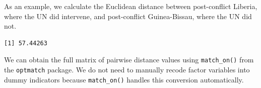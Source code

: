 \documentclass[
  12pt,
  leqno]{article}
\newenvironment{Shaded}{\begin{snugshade}}{\end{snugshade}}
\newcommand{\CommentTok}[1]{\textcolor[rgb]{0.56,0.35,0.01}{\textit{#1}}}
\newcommand{\DecValTok}[1]{\textcolor[rgb]{0.00,0.00,0.81}{#1}}
\newcommand{\FunctionTok}[1]{\textcolor[rgb]{0.13,0.29,0.53}{\textbf{#1}}}
\newcommand{\NormalTok}[1]{#1}
\newcommand{\OtherTok}[1]{\textcolor[rgb]{0.56,0.35,0.01}{#1}}
\newcommand{\SpecialCharTok}[1]{\textcolor[rgb]{0.81,0.36,0.00}{\textbf{#1}}}
\newcommand{\StringTok}[1]{\textcolor[rgb]{0.31,0.60,0.02}{#1}}
\begin{document}
\doublespacing

As an example, we calculate the Euclidean distance between post-conflict
Liberia, where the UN did intervene, and post-conflict Guinea-Bissau,
where the UN did not.

\singlespacing

\begin{Shaded}
\end{Shaded}

\begin{verbatim}
[1] 57.44263
\end{verbatim}

\doublespacing

We can obtain the full matrix of pairwise distance values using
\texttt{match\_on()} from the \texttt{optmatch} package. We do not need
to manually recode factor variables into dummy indicators because
\texttt{match\_on()} handles this conversion automatically.

\singlespacing
\end{document}
